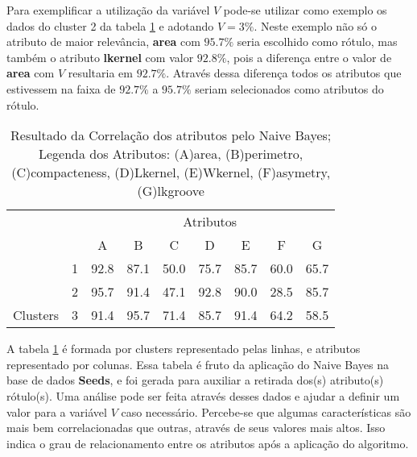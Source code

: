 Para exemplificar a utilização da variável ${V}$ pode-se utilizar como exemplo os dados do cluster 2 da tabela \ref{tab:matrelevancia:seeds:nb} e adotando ${V=3\%}$.  Neste exemplo não só o atributo de maior relevância, \textbf{area} com ${95.7\%}$ seria escolhido como rótulo, mas também o atributo \textbf{lkernel} com valor ${92.8\%}$, pois a diferença entre o valor de \textbf{area} com ${V}$ resultaria em ${92.7\%}$. Através dessa diferença todos os atributos que estivessem na faixa de ${92.7\%}$ a  ${95.7\%}$ seriam selecionados como atributos do rótulo.

\begin{table}[!h]
    
    \caption{Resultado da Correlação dos atributos pelo Naive Bayes; Legenda dos Atributos: (A)area, (B)perimetro, (C)compacteness, (D)Lkernel, (E)Wkernel, (F)asymetry, (G)lkgroove}    
    \centering
   \small\addtolength{\tabcolsep}{+2pt}
    \begin{tabular}{|cl|c|c|c|c|c|c|c|}
        \hline \hline
                                &   & \multicolumn{7}{c|}{Atributos}          \\ \cline{3-9} 
        \multicolumn{1}{|l}{}                            &   & A    & B & C & D & E & F & G \\ \hline
        \multicolumn{1}{|c|}{}                           & 1 & 92.8 & 87.1   & 50.0      & 75.7 & 85.7 & 60.0   & 65.7   \\ \cline{2-9} 
        \multicolumn{1}{|c|}{}                           & 2 & 95.7 & 91.4   & 47.1      & 92.8 & 90.0 & 28.5  & 85.7  \\ \cline{2-9} 
        \multicolumn{1}{|c|}{\multirow{-3}{*}{Clusters}} & 3 & 91.4 & 95.7   & 71.4      & 85.7 & 91.4 & 64.2  & 58.5  \\ \hline
    \end{tabular}
    \label{tab:matrelevancia:seeds:nb} 
\end{table}

A tabela \ref{tab:matrelevancia:seeds:nb} é formada por clusters representado pelas linhas, e atributos representado por colunas. Essa tabela é fruto da aplicação do Naive Bayes na base de dados \textbf{Seeds}, e foi  gerada para auxiliar a retirada dos(s) atributo(s) rótulo(s). Uma análise pode ser feita através desses dados e ajudar a definir um valor para a variável ${V}$ caso necessário. Percebe-se que algumas características são mais bem correlacionadas que  outras, através de seus valores mais altos. Isso indica o grau de relacionamento entre os atributos após a aplicação do algoritmo. 


